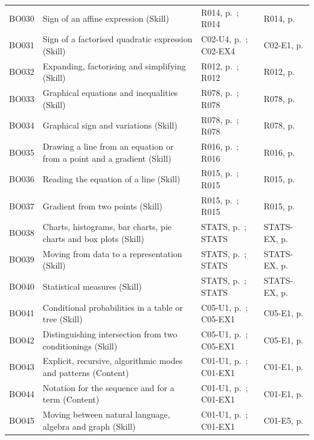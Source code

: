 \begin{longtable}{p{.1\linewidth}p{.43\linewidth}p{.19\linewidth}p{.16\linewidth}}
BO030 & Sign of an affine expression (Skill) & R014, p.\,\pageref{R014} ; R014 & R014, p.\,\pageref{R014} \\
BO031 & Sign of a factorised quadratic expression (Skill) & C02-U4, p.\,\pageref{C02-U4} ; C02-EX4 & C02-E1, p.\,\pageref{C02-E1} \\
BO032 & Expanding, factorising and simplifying (Skill) & R012, p.\,\pageref{R012} ; R012 & R012, p.\,\pageref{R012} \\
BO033 & Graphical equations and inequalities (Skill) & R078, p.\,\pageref{R078} ; R078 & R078, p.\,\pageref{R078} \\
BO034 & Graphical sign and variations (Skill) & R078, p.\,\pageref{R078} ; R078 & R078, p.\,\pageref{R078} \\
BO035 & Drawing a line from an equation or from a point and a gradient (Skill) & R016, p.\,\pageref{R016} ; R016 & R016, p.\,\pageref{R016} \\
BO036 & Reading the equation of a line (Skill) & R015, p.\,\pageref{R015} ; R015 & R015, p.\,\pageref{R015} \\
BO037 & Gradient from two points (Skill) & R015, p.\,\pageref{R015} ; R015 & R015, p.\,\pageref{R015} \\
BO038 & Charts, histograms, bar charts, pie charts and box plots (Skill) & STATS, p.\,\pageref{STATS} ; STATS & STATS-EX, p.\,\pageref{STATS-EX} \\
BO039 & Moving from data to a representation (Skill) & STATS, p.\,\pageref{STATS} ; STATS & STATS-EX, p.\,\pageref{STATS-EX} \\
BO040 & Statistical measures (Skill) & STATS, p.\,\pageref{STATS} ; STATS & STATS-EX, p.\,\pageref{STATS-EX} \\
BO041 & Conditional probabilities in a table or tree (Skill) & C05-U1, p.\,\pageref{C05-U1} ; C05-EX1 & C05-E1, p.\,\pageref{C05-E1} \\
BO042 & Distinguishing intersection from two conditionings (Skill) & C05-U1, p.\,\pageref{C05-U1} ; C05-EX1 & C05-E1, p.\,\pageref{C05-E1} \\
BO043 & Explicit, recursive, algorithmic modes and patterns (Content) & C01-U1, p.\,\pageref{C01-U1} ; C01-EX1 & C01-E1, p.\,\pageref{C01-E1} \\
BO044 & Notation for the sequence and for a term (Content) & C01-U1, p.\,\pageref{C01-U1} ; C01-EX1 & C01-E1, p.\,\pageref{C01-E1} \\
BO045 & Moving between natural language, algebra and graph (Skill) & C01-U1, p.\,\pageref{C01-U1} ; C01-EX1 & C01-E5, p.\,\pageref{C01-E5} \\

\end{longtable}
